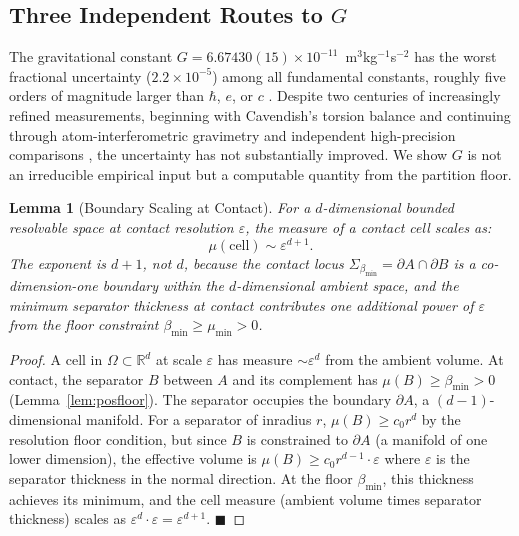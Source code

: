 \documentclass[12pt, a4paper]{article}
\theoremstyle{plain}
\newtheorem{lemma}[theorem]{Lemma}
\theoremstyle{definition}
\theoremstyle{remark}
\newcommand{\bmin}{\beta_{\min}}
\newcommand{\qed}{\hfill$\blacksquare$}
\begin{document}
\subsection{Three Independent Routes to $G$}

The gravitational constant $G = 6.67430(15)\times10^{-11}$~m$^3$kg$^{-1}$s$^{-2}$
has the worst fractional uncertainty ($2.2\times10^{-5}$) among all fundamental
constants, roughly five orders of magnitude larger than $\hbar$, $e$, or $c$
\citep{codata2018,speake2014}. Despite two centuries of increasingly refined
measurements, beginning with Cavendish's torsion balance \citep{cavendish1798}
and continuing through atom-interferometric gravimetry \citep{rosi2014} and
independent high-precision comparisons \citep{quinn2013}, the uncertainty has
not substantially improved. We show $G$ is not an irreducible empirical input
but a computable quantity from the partition floor.

\begin{lemma}[Boundary Scaling at Contact]
\label{lem:boundary_scaling}
For a $d$-dimensional bounded resolvable space at contact resolution $\varepsilon$,
the measure of a contact cell scales as:
\[
  \mu(\text{cell}) \sim \varepsilon^{d+1}.
\]
The exponent is $d + 1$, not $d$, because the contact locus
$\Sigma_{\bmin} = \partial A \cap \partial B$ is a co-dimension-one boundary
within the $d$-dimensional ambient space, and the minimum separator thickness
at contact contributes one additional power of $\varepsilon$ from the floor
constraint $\bmin \geq \mu_{\min} > 0$.
\end{lemma}

\begin{proof}
A cell in $\Omega \subset \mathbb{R}^d$ at scale $\varepsilon$ has measure
$\sim\varepsilon^d$ from the ambient volume. At contact, the separator $B$
between $A$ and its complement has $\mu(B) \geq \bmin > 0$ (Lemma~\ref{lem:posfloor}).
The separator occupies the boundary $\partial A$, a $(d-1)$-dimensional manifold.
For a separator of inradius $r$, $\mu(B) \geq c_0 r^d$ by the resolution floor
condition, but since $B$ is constrained to $\partial A$ (a manifold of one lower
dimension), the effective volume is $\mu(B) \geq c_0 r^{d-1}\cdot\varepsilon$
where $\varepsilon$ is the separator thickness in the normal direction. At the
floor $\bmin$, this thickness achieves its minimum, and the cell measure (ambient
volume times separator thickness) scales as $\varepsilon^d \cdot \varepsilon =
\varepsilon^{d+1}$. \qed
\end{proof}
\end{document}
